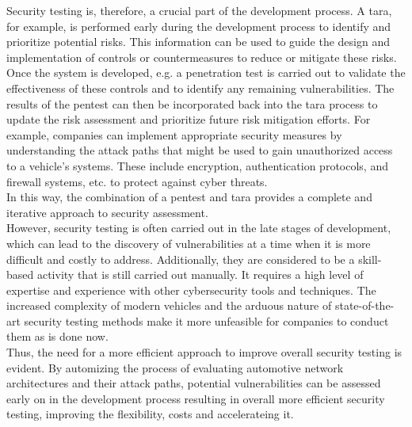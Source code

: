 Security testing is, therefore, a crucial part of the development process.
A \gls{tara}, for example, is performed early during the development process to identify and prioritize potential risks.
This information can be used to guide the design and implementation of controls or countermeasures to reduce or mitigate these risks.
Once the system is developed, e.g. a penetration test is carried out to validate the effectiveness of these controls and to identify any remaining vulnerabilities. 
The results of the pentest can then be incorporated back into the \gls{tara} process to update the risk assessment and prioritize future risk mitigation efforts. 
For example, companies can implement appropriate security measures by understanding the attack paths that might be used to gain unauthorized access to a vehicle's systems. 
These include encryption, authentication protocols, and firewall systems, etc. to protect against cyber threats.\\
In this way, the combination of a pentest and \gls{tara} provides a complete and iterative approach to security assessment.\\
However, security testing is often carried out in the late stages of development, which can lead to the discovery of vulnerabilities at a time when it is more difficult and costly to address.
Additionally, they are considered to be a skill-based activity that is still carried out manually.
It requires a high level of expertise and experience with other cybersecurity tools and techniques. 
The increased complexity of modern vehicles and the arduous nature of state-of-the-art security testing methods make it more unfeasible for companies to conduct them as is done now.\\
Thus, the need for a more efficient approach to improve overall security testing is evident. 
By automizing the process of evaluating automotive network architectures and their attack paths, 
potential vulnerabilities can be assessed early on in the development process resulting in overall more efficient security testing, improving the flexibility, costs and accelerateing it.\\

